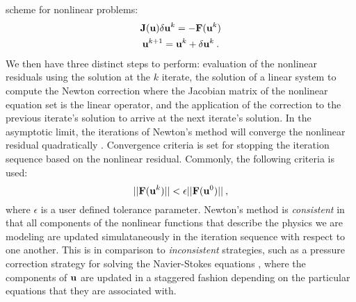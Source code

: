 scheme for nonlinear problems:
\begin{subequations}
  \begin{gather}
    \mathbf{J}(\mathbf{u}) \delta \mathbf{u}^k = -\mathbf{F}(\mathbf{u}^{k})\\
    \mathbf{u}^{k+1} = \mathbf{u}^k + \delta \mathbf{u}^k\:.
  \end{gather}
  \label{eq:newton_iteration}
\end{subequations}
We then have three distinct steps to perform: evaluation of the
nonlinear residuals using the solution at the $k$ iterate, the
solution of a linear system to compute the Newton correction where the
Jacobian matrix of the nonlinear equation set is the linear operator,
and the application of the correction to the previous iterate's
solution to arrive at the next iterate's solution. In the asymptotic
limit, the iterations of Newton's method will converge the nonlinear
residual quadratically \citep{kelley_iterative_1995}. Convergence
criteria is set for stopping the iteration sequence based on the
nonlinear residual. Commonly, the following criteria is used:
\begin{equation}
  ||\mathbf{F}(\mathbf{u}^{k})|| < \epsilon ||\mathbf{F}(\mathbf{u}^{0})||\:,
  \label{eq:newton_stopping_criteria}
\end{equation}
where $\epsilon$ is a user defined tolerance parameter. Newton's
method is \textit{consistent} in that all components of the nonlinear
functions that describe the physics we are modeling are updated
simulataneously in the iteration sequence with respect to one
another. This is in comparison to \textit{inconsistent} strategies,
such as a pressure correction strategy for solving the Navier-Stokes
equations \citep{pletcher_computational_1997}, where the components of
$\mathbf{u}$ are updated in a staggered fashion depending on the
particular equations that they are associated with.


